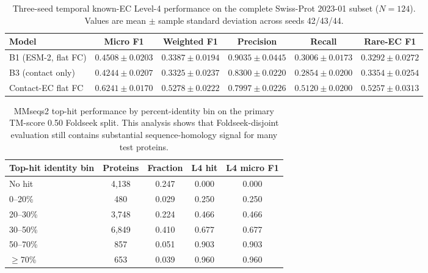 \documentclass[11pt,a4paper]{article}
\begin{document}
\begin{table}[htbp]
\centering
\caption{Three-seed temporal known-EC Level-4 performance on the complete
Swiss-Prot 2023-01 subset ($N=124$). Values are mean $\pm$ sample standard
deviation across seeds 42/43/44.}
\label{tab:temporal_seed_repeats}
\small
\setlength{\tabcolsep}{4pt}
\begin{tabular}{lccccc}
\toprule
Model & Micro F1 & Weighted F1 & Precision & Recall & Rare-EC F1 \\
\midrule
B1 (ESM-2, flat FC) & $0.4508\pm0.0203$ & $0.3387\pm0.0194$ & $\mathbf{0.9035\pm0.0445}$ & $0.3006\pm0.0173$ & $0.3292\pm0.0272$ \\
B3 (contact only) & $0.4244\pm0.0207$ & $0.3325\pm0.0237$ & $0.8300\pm0.0220$ & $0.2854\pm0.0200$ & $0.3354\pm0.0254$ \\
Contact-EC flat FC & $\mathbf{0.6241\pm0.0170}$ & $\mathbf{0.5278\pm0.0222}$ & $0.7997\pm0.0226$ & $\mathbf{0.5120\pm0.0200}$ & $\mathbf{0.5257\pm0.0313}$ \\
\bottomrule
\end{tabular}
\end{table}

\begin{table}[htbp]
\centering
\caption{MMseqs2 top-hit performance by percent-identity bin on the primary
TM-score 0.50 Foldseek split. This analysis shows that Foldseek-disjoint
evaluation still contains substantial sequence-homology signal for many test
proteins.}
\label{tab:mmseqs_identity_bins}
\small
\setlength{\tabcolsep}{5pt}
\begin{tabular}{lcccc}
\toprule
Top-hit identity bin & Proteins & Fraction & L4 hit & L4 micro F1 \\
\midrule
No hit & 4{,}138 & 0.247 & 0.000 & 0.000 \\
0--20\% & 480 & 0.029 & 0.250 & 0.250 \\
20--30\% & 3{,}748 & 0.224 & 0.466 & 0.466 \\
30--50\% & 6{,}849 & 0.410 & 0.677 & 0.677 \\
50--70\% & 857 & 0.051 & 0.903 & 0.903 \\
$\geq$70\% & 653 & 0.039 & 0.960 & 0.960 \\
\bottomrule
\end{tabular}
\end{table}
\end{document}
